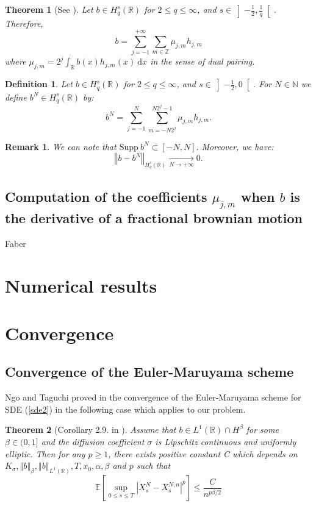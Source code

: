 \documentclass{article}[12pt]
\newtheorem{defi}{Definition}[section]
\newtheorem{theo}{Theorem}[section]
\newtheorem{rem}{Remark}[section]
\newcommand{\norme}[1]{\left\Vert #1\right\Vert}
\newcommand{\R}{\mathbb{R}}
\newcommand{\Z}{\mathbb{Z}}
\newcommand{\N}{\mathbb{N}}
\newcommand{\di}{\mathrm{d}}
\begin{document}
    \begin{theo}[See \cite{Iss-Rus-2200}]
        Let $b\in H^s_q(\R)$ for $2\leq q \leq \infty$, and $s\in\left]-\frac{1}{2},\frac{1}{q}\right[$. Therefore,
        \begin{equation}
        b = \sum_{j=-1}^{+\infty}\sum_{m\in\Z}\mu_{j,m}h_{j,m}
        \end{equation}
        where $\mu_{j,m} = 2^j\int_{\R}b(x)h_{j,m}(x)\ \di x$ in the sense of dual pairing.
    \end{theo}

    \begin{defi}
        Let $b\in H^s_q(\R)$ for $2\leq q \leq \infty$, and $s\in\left]-\frac{1}{2},0\right[$. For $N\in\N$ we define $b^N\in H_q^s(\R)$ by:
        \begin{equation}
        b^N = \sum_{j=-1}^{N}\sum_{m=-N2^j}^{N2^j-1}\mu_{j,m}h_{j,m}.
        \end{equation}
    \end{defi}

    \begin{rem}
        We can note that $\mathrm{Supp}\ b^N\subset [-N,N].$ Moreover, we have: $$\norme{b-b^N}_{H_q^s(\R)} \underset{N\rightarrow+\infty}{\longrightarrow} 0.$$
    \end{rem}

    \subsection{Computation of the coefficients $\mu_{j,m}$ when $b$ is the derivative of a fractional brownian motion}
        Faber
\section{Numerical results}
\section{Convergence} 
    
    \subsection{Convergence of the Euler-Maruyama scheme}
    
    Ngo and Taguchi proved in \cite{Ngo-Tag-2017} the convergence of the Euler-Maruyama scheme for SDE (\ref{sde2}) in the following case which applies to our problem.
    
    \begin{theo}[Corollary 2.9. in \cite{Ngo-Tag-2017}]
        Assume that $b\in L^1(\R)\cap H^\beta$ for some $\beta\in(0,1]$  and the diffusion coefficient $\sigma$
        is Lipschitz continuous and uniformly elliptic. Then for any $p\geq1$, there exists positive constant C
        which depends on $K_\sigma,\norme{b}_\beta,\norme{b}_{L^1(\R)},T,x_0,\alpha,\beta$ and $p$ such that
        \begin{equation}
        \mathbb{E}\left[\sup_{0\leq s\leq T}\left|X_s^N - X_s^{N,n}\right|^p\right] \leq \frac{C}{n^{p\beta/2}}
        \end{equation}
    \end{theo}
\end{document}
